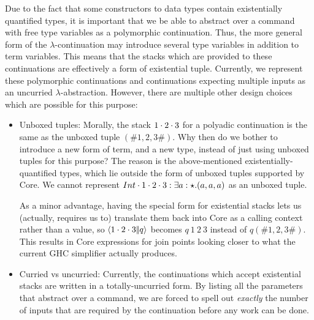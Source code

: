 \documentclass{article}
\begin{document}
Due to the fact that some constructors to data types contain existentially
quantified types, it is important that we be able to abstract over a command
with free type variables as a polymorphic continuation.  Thus, the more general
form of the $\lambda$-continuation may introduce several type variables in
addition to term variables.  This means that the stacks which are provided to
these continuations are effectively a form of existential tuple.  Currently, we
represent these polymorphic continuations and continuations expecting multiple
inputs as an uncurried $\lambda$-abstraction.  However, there are multiple other
design choices which are possible for this purpose:
\begin{itemize}
\item Unboxed tuples: Morally, the stack ${1}\cdot{{2}\cdot{3}}$ for a polyadic
  continuation is the same as the unboxed tuple $(\# 1, 2, 3 \#)$.  Why then do
  we bother to introduce a new form of term, and a new type, instead of just
  using unboxed tuples for this purpose?  The reason is the above-mentioned
  existentially-quantified types, which lie outside the form of unboxed tuples
  supported by Core.  We cannot represent
  $\packrets[\stackty{a:\star}{a, a, a}]{\pack{Int}{\pack{1}{\pack{2}{3}}}}$ as
  an unboxed tuple.

  As a minor advantage, having the special form for existential stacks lets us
  (actually, requires us to) translate them back into Core as a calling context
  rather than a value, so $\left\langle{{1}\cdot{{2}\cdot{3}}}\middle|\!\middle|{q}\right\rangle$ becomes $q ~ 1 ~ 2 ~ 3$
  instead of $q (\# 1, 2, 3 \#)$.  This results in Core expressions for join
  points looking closer to what the current GHC simplifier actually produces.

\item Curried vs uncurried: Currently, the continuations which accept
  existential stacks are written in a totally-uncurried form.  By listing all
  the parameters that abstract over a command, we are forced to spell out
  \emph{exactly} the number of inputs that are required by the continuation
  before any work can be done.


\end{itemize}
\end{document}
